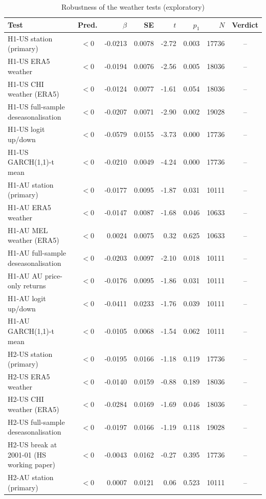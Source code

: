 \begin{table}[htbp]\centering\small
\caption{Robustness of the weather tests (exploratory)}
\begin{tabular}{lcrrrrrc}\toprule
Test & Pred. & $\beta$ & SE & $t$ & $p_{1}$ & $N$ & Verdict \\ \midrule
H1-US station (primary) & $<$0 & -0.0213 & 0.0078 & -2.72 & 0.003 & 17736 & -- \\
H1-US ERA5 weather & $<$0 & -0.0194 & 0.0076 & -2.56 & 0.005 & 18036 & -- \\
H1-US CHI weather (ERA5) & $<$0 & -0.0124 & 0.0077 & -1.61 & 0.054 & 18036 & -- \\
H1-US full-sample deseasonalisation & $<$0 & -0.0207 & 0.0071 & -2.90 & 0.002 & 19028 & -- \\
H1-US logit up/down & $<$0 & -0.0579 & 0.0155 & -3.73 & 0.000 & 17736 & -- \\
H1-US GARCH(1,1)-t mean & $<$0 & -0.0210 & 0.0049 & -4.24 & 0.000 & 17736 & -- \\
H1-AU station (primary) & $<$0 & -0.0177 & 0.0095 & -1.87 & 0.031 & 10111 & -- \\
H1-AU ERA5 weather & $<$0 & -0.0147 & 0.0087 & -1.68 & 0.046 & 10633 & -- \\
H1-AU MEL weather (ERA5) & $<$0 & 0.0024 & 0.0075 & 0.32 & 0.625 & 10633 & -- \\
H1-AU full-sample deseasonalisation & $<$0 & -0.0203 & 0.0097 & -2.10 & 0.018 & 10111 & -- \\
H1-AU AU price-only returns & $<$0 & -0.0176 & 0.0095 & -1.86 & 0.031 & 10111 & -- \\
H1-AU logit up/down & $<$0 & -0.0411 & 0.0233 & -1.76 & 0.039 & 10111 & -- \\
H1-AU GARCH(1,1)-t mean & $<$0 & -0.0105 & 0.0068 & -1.54 & 0.062 & 10111 & -- \\
H2-US station (primary) & $<$0 & -0.0195 & 0.0166 & -1.18 & 0.119 & 17736 & -- \\
H2-US ERA5 weather & $<$0 & -0.0140 & 0.0159 & -0.88 & 0.189 & 18036 & -- \\
H2-US CHI weather (ERA5) & $<$0 & -0.0284 & 0.0169 & -1.69 & 0.046 & 18036 & -- \\
H2-US full-sample deseasonalisation & $<$0 & -0.0197 & 0.0166 & -1.19 & 0.118 & 19028 & -- \\
H2-US break at 2001-01 (HS working paper) & $<$0 & -0.0043 & 0.0162 & -0.27 & 0.395 & 17736 & -- \\
H2-AU station (primary) & $<$0 & 0.0007 & 0.0121 & 0.06 & 0.523 & 10111 & -- \\

\end{tabular}
\end{table}
